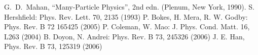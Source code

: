 \documentclass[a4paper,10pt]{jsarticle}
\begin{document}
%

\begin{thebibliography}{99}
 G.~D.~Mahan, ``Many-Particle Physics'', 2nd edn. (Plenum, New York, 1990).
 S. Hershfield: Phys. Rev. Lett. 70, 2135 (1993)
 P. Bokes, H. Mera, R. W. Godby: Phys. Rev. B 72 165425 (2005)
 P. Coleman, W. Mao: J. Phys. Cond. Matt. 16, L263 (2004)
 B. Doyon, N. Andrei: Phys. Rev. B 73, 245326 (2006)
 J. E. Han, Phys. Rev. B 73, 125319 (2006)
\end{thebibliography}
\end{document}
